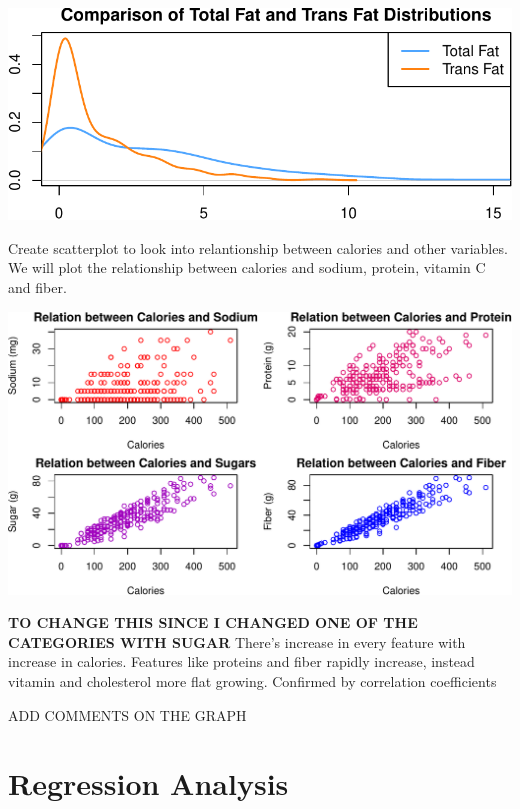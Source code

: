 \documentclass[
]{article}
\begin{document}
\begin{center}\includegraphics{Statistical_Learning_Final_Report_files/figure-latex/fat_comparison_-1} \end{center}

Create scatterplot to look into relantionship between calories and other
variables. We will plot the relationship between calories and sodium,
protein, vitamin C and fiber.

\begin{center}\includegraphics{Statistical_Learning_Final_Report_files/figure-latex/scatterplot-1} \end{center}

\textbf{TO CHANGE THIS SINCE I CHANGED ONE OF THE CATEGORIES WITH SUGAR}
There's increase in every feature with increase in calories. Features
like proteins and fiber rapidly increase, instead vitamin and
cholesterol more flat growing. Confirmed by correlation coefficients

ADD COMMENTS ON THE GRAPH

\section{Regression Analysis}\label{regression-analysis}
\end{document}
